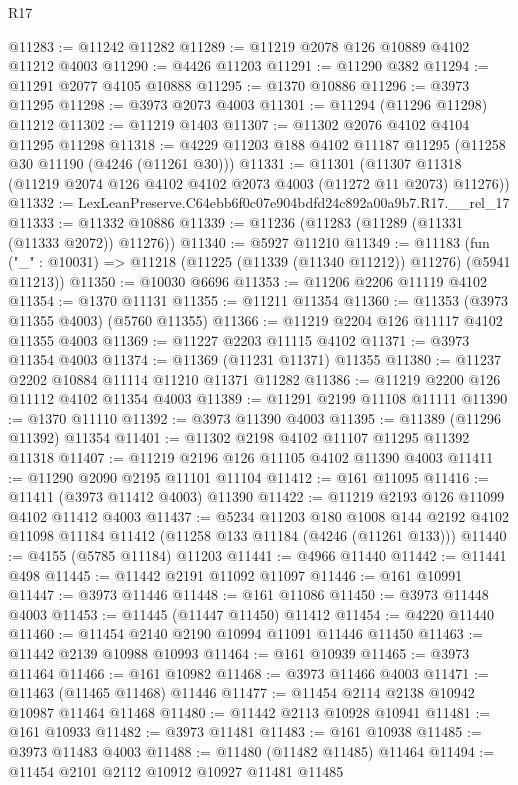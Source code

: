 \begin{lexlean}{R17}
\begin{coremodule}
@11283 := @11242 @11282
@11289 := @11219 @2078 @126 @10889 @4102 @11212 @4003
@11290 := @4426 @11203
@11291 := @11290 @382
@11294 := @11291 @2077 @4105 @10888
@11295 := @1370 @10886
@11296 := @3973 @11295
@11298 := @3973 @2073 @4003
@11301 := @11294 (@11296 @11298) @11212
@11302 := @11219 @1403
@11307 := @11302 @2076 @4102 @4104 @11295 @11298
@11318 := @4229 @11203 @188 @4102 @11187 @11295 (@11258 @30 @11190 (@4246 (@11261 @30)))
@11331 := @11301
    (@11307 @11318 (@11219 @2074 @126 @4102 @4102 @2073 @4003 (@11272 @11 @2073) @11276))
@11332 := LexLeanPreserve.C64ebb6f0c07e904bdfd24c892a00a9b7.R17.__rel_17
@11333 := @11332 @10886
@11339 := @11236 (@11283 (@11289 (@11331 (@11333 @2072)) @11276))
@11340 := @5927 @11210
@11349 := @11183
    (fun ("_" : @10031) => @11218 (@11225 (@11339 (@11340 @11212)) @11276) (@5941 @11213))
@11350 := @10030 @6696
@11353 := @11206 @2206 @11119 @4102
@11354 := @1370 @11131
@11355 := @11211 @11354
@11360 := @11353 (@3973 @11355 @4003) (@5760 @11355)
@11366 := @11219 @2204 @126 @11117 @4102 @11355 @4003
@11369 := @11227 @2203 @11115 @4102
@11371 := @3973 @11354 @4003
@11374 := @11369 (@11231 @11371) @11355
@11380 := @11237 @2202 @10884 @11114 @11210 @11371 @11282
@11386 := @11219 @2200 @126 @11112 @4102 @11354 @4003
@11389 := @11291 @2199 @11108 @11111
@11390 := @1370 @11110
@11392 := @3973 @11390 @4003
@11395 := @11389 (@11296 @11392) @11354
@11401 := @11302 @2198 @4102 @11107 @11295 @11392 @11318
@11407 := @11219 @2196 @126 @11105 @4102 @11390 @4003
@11411 := @11290 @2090 @2195 @11101 @11104
@11412 := @161 @11095
@11416 := @11411 (@3973 @11412 @4003) @11390
@11422 := @11219 @2193 @126 @11099 @4102 @11412 @4003
@11437 := @5234
    @11203
    @180
    @1008
    @144
    @2192
    @4102
    @11098
    @11184
    @11412
    (@11258 @133 @11184 (@4246 (@11261 @133)))
@11440 := @4155 (@5785 @11184) @11203
@11441 := @4966 @11440
@11442 := @11441 @498
@11445 := @11442 @2191 @11092 @11097
@11446 := @161 @10991
@11447 := @3973 @11446
@11448 := @161 @11086
@11450 := @3973 @11448 @4003
@11453 := @11445 (@11447 @11450) @11412
@11454 := @4220 @11440
@11460 := @11454 @2140 @2190 @10994 @11091 @11446 @11450
@11463 := @11442 @2139 @10988 @10993
@11464 := @161 @10939
@11465 := @3973 @11464
@11466 := @161 @10982
@11468 := @3973 @11466 @4003
@11471 := @11463 (@11465 @11468) @11446
@11477 := @11454 @2114 @2138 @10942 @10987 @11464 @11468
@11480 := @11442 @2113 @10928 @10941
@11481 := @161 @10933
@11482 := @3973 @11481
@11483 := @161 @10938
@11485 := @3973 @11483 @4003
@11488 := @11480 (@11482 @11485) @11464
@11494 := @11454 @2101 @2112 @10912 @10927 @11481 @11485

\end{coremodule}
\end{lexlean}
